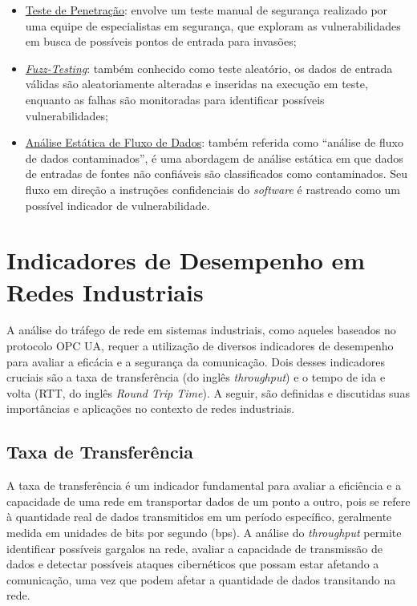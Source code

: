         \begin{itemize}
            \item \underline{Teste de Penetração}: envolve um teste manual de segurança realizado por uma equipe de especialistas em segurança, que exploram as vulnerabilidades em busca de possíveis pontos de entrada para invasões;
            \item \underline{\textit{Fuzz-Testing}}: também conhecido como teste aleatório, os dados de entrada válidas são aleatoriamente alteradas e inseridas na execução em teste, enquanto as falhas são monitoradas para identificar possíveis vulnerabilidades;
            \item \underline{Análise Estática de Fluxo de Dados}: também referida como ``análise de fluxo de dados contaminados'', é uma abordagem de análise estática em que dados de entradas de fontes não confiáveis são classificados como contaminados. Seu fluxo em direção a instruções confidenciais do \textit{software} é rastreado como um possível indicador de vulnerabilidade.
        \end{itemize}

\section{Indicadores de Desempenho em Redes Industriais}

    A análise do tráfego de rede em sistemas industriais, como aqueles baseados no protocolo OPC UA, requer a utilização de diversos indicadores de desempenho para avaliar a eficácia e a segurança da comunicação. Dois desses indicadores cruciais são a taxa de transferência (do inglês \textit{throughput}) e o tempo de ida e volta (RTT, do inglês \textit{Round Trip Time}). A seguir, são definidas e discutidas suas importâncias e aplicações no contexto de redes industriais.
    
    \subsection{Taxa de Transferência}
    
        A taxa de transferência é um indicador fundamental para avaliar a eficiência e a capacidade de uma rede em transportar dados de um ponto a outro, pois se refere à quantidade real de dados transmitidos em um período específico, geralmente medida em unidades de bits por segundo (bps). A análise do \textit{throughput} permite identificar possíveis gargalos na rede, avaliar a capacidade de transmissão de dados e detectar possíveis ataques cibernéticos que possam estar afetando a comunicação, uma vez que podem afetar a quantidade de dados transitando na rede.
        

